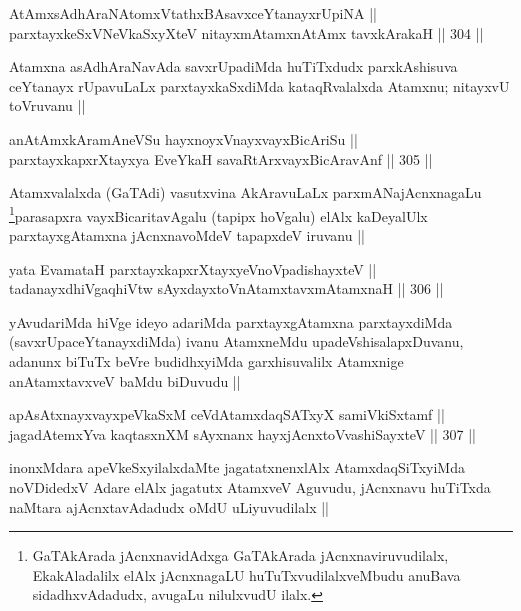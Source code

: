 \begin{shl}
AtAmxsAdhAraNAtomxVtathxBAsavxceYtanayxrUpiNA || \\
parxtayxkeSxVNeVkaSxyXteV nitayxmAtamxnA\s \s tAmx tavxkArakaH ||  304 ||  
\end{shl}

\begin{artha}
Atamxna asAdhAraNavAda savxrUpadiMda huTiTxdudx parxkAshisuva ceYtanayx rUpavuLaLx parxtayxkaSxdiMda kataqRvalalxda Atamxnu; nitayxvU toVruvanu ||
\end{artha}

\begin{shl}
anAtAmxkAramAneVSu hayxnoyxVnayxvayxBicAriSu || \\
parxtayxkapxrXtayxya EveYkaH savaRtArxvayxBicAravAnf ||  305 ||  
\end{shl}

\begin{artha}
Atamxvalalxda (GaTAdi) vasutxvina AkAravuLaLx parxmANajAcnxnagaLu \footnote{GaTAkArada jAcnxnavidAdxga GaTAkArada jAcnxnaviruvudilalx, EkakAladalilx elAlx jAcnxnagaLU huTuTxvudilalxveMbudu anuBava sidadhxvAdadudx, avugaLu nilulxvudU ilalx.}parasapxra vayxBicaritavAgalu (tapipx hoVgalu) elAlx kaDeyalUlx parxtayxgAtamxna jAcnxnavoMdeV tapapxdeV iruvanu ||
\end{artha}

\begin{shl}
yata EvamataH parxtayxkapxrXtayxyeVnoVpadishayxteV || \\
tadanayxdhiVgaqhiVtw sAyxdayxtoV\s nAtamxtavxmAtamxnaH ||  306 ||  
\end{shl}

\begin{artha}
yAvudariMda hiVge ideyo adariMda parxtayxgAtamxna parxtayxdiMda (savxrUpaceYtanayxdiMda) ivanu AtamxneMdu upadeVshisalapxDuvanu, adanunx biTuTx beVre budidhxyiMda garxhisuvalilx Atamxnige anAtamxtavxveV baMdu biDuvudu ||
\end{artha}

\begin{shl}
apAsAtxnayxvayxpeVkaSxM ceVdAtamxdaqSATxyX samiVkiSxtamf || \\
jagadAtemxYva kaqtasxnXM sAyxnanx hayxjAcnxtoV\s vashiSayxteV ||  307 ||  
\end{shl}	

\begin{artha}
inonxMdara apeVkeSxyilalxdaMte jagatatxnenxlAlx AtamxdaqSiTxyiMda noVDidedxV Adare elAlx jagatutx AtamxveV Aguvudu, jAcnxnavu huTiTxda naMtara ajAcnxtavAdadudx oMdU uLiyuvudilalx ||
\end{artha}

